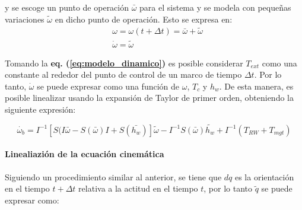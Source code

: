 y se escoge un punto de operación $\bar{\omega}$ para el sistema y se modela con pequeñas variaciones $\tilde{\omega}$ en dicho punto de operación. Esto se expresa en:
\begin{equation}
	\begin{aligned}
		& \omega = \omega(t+\Delta t) = \bar{\omega} + \tilde{\omega}\\
		& \dot{\omega} = \tilde{\omega}
	\end{aligned}	 
\end{equation}

Tomando la \textbf{eq. (\ref{eq:modelo_dinamico})} es posible considerar $T_{ext}$ como una constante al rededor del punto de control de un marco de tiempo $\Delta t$. Por lo tanto, $\dot{\omega}$ se puede expresar como una función de $\omega$, $T_c$ y $h_w$. De esta manera, es posible linealizar usando la expansión de Taylor de primer orden, obteniendo la siguiente expresión:

\begin{equation}\label{eq:modelo_dinamico_linealizado}
	\dot{\omega_b}=I^{-1}\left[S(I\bar{\omega}-S(\bar{\omega})I+S(\bar{h_w})\right]\tilde{\omega}-I^{-1}S(\bar{\omega})\tilde{h_w}+I^{-1}\left(T_{RW}+T_{mgt}\right)
\end{equation}

\paragraph{Linealiazión de la ecuación cinemática}
\hfill \break
Siguiendo un procedimiento similar al anterior, se tiene que $dq$ es la orientación en el tiempo $t +\Delta t$ relativa a la actitud en el tiempo $t$, por lo tanto $\tilde{q}$ se puede expresar como:
 
